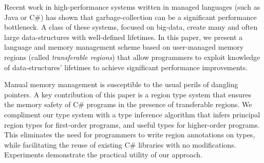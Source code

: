 Recent work in high-performance 
systems written in managed languages 
(such as Java or C\#) has shown that garbage-collection can be a
significant performance bottleneck.  A class of these
systems, focused on big-data, create many and often large data-structures with
well-defined lifetimes.  In this paper, we present a language and
memory management scheme based on user-managed memory regions (called
\emph{transferable regions}) that allow programmers to exploit
knowledge of data-structures' lifetimes to achieve significant
performance improvements.

Manual memory management is susceptible to the usual perils of
dangling pointers.  A key contribution of this paper is a region type
system that ensures the memory safety of C\# programs in the presence
of transferable regions. We compliment our type system with a type
inference algorithm that infers principal region types for first-order
programs, and useful types for higher-order programs. This eliminates
the need for programmers to write region annotations on types, while
facilitating the reuse of existing C\# libraries with no
modifications. Experiments demonstrate the practical utility of our
approach.

